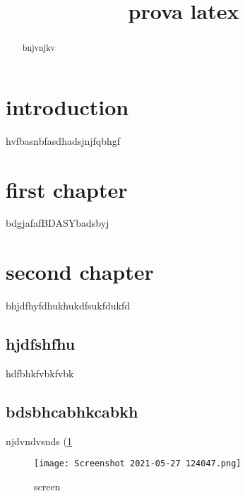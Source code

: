 \documentclass[a4paper,12pt]{article}
\title{ prova latex}
\begin{document}
\begin{abstract}
    bnjvnjkv
\end{abstract}
\maketitle
\section{introduction}
hvfbasnbfasdhadsjnjfqbhgf
\section{first chapter}
bdgjafafBDASYbadsbyj
\section*{ second chapter}
bhjdfhyfdhukhukdfsukfdukfd
\subsection{hjdfshfhu}
hdfbhkfvbkfvbk

\subsection*{bdsbhcabhkcabkh}
njdvndvsnds (\ref{fig:Screenshot 2021-05-27 124047.png}



\begin{figure}
    \centering
    \texttt{[image: Screenshot 2021-05-27 124047.png]}
    \caption{screen}
    \label{fig:Screenshot 2021-05-27 124047.png}
\end{figure}
\end{document}
